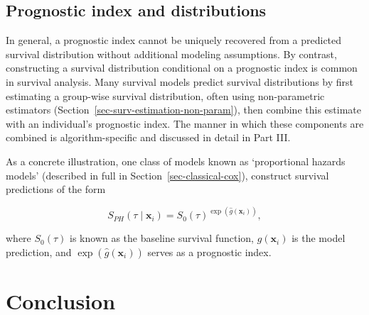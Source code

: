 \documentclass[
  letterpaper,
  krantz2]{style/krantz}
\begin{document}
\subsection{Prognostic index and
distributions}\label{prognostic-index-and-distributions}

In general, a prognostic index cannot be uniquely recovered from a
predicted survival distribution without
additional modeling assumptions. By contrast, constructing a survival
distribution conditional on a prognostic index is common in survival
analysis. Many survival models predict survival distributions by first
estimating a group-wise survival distribution, often using
non-parametric estimators
(Section~\ref{sec-surv-estimation-non-param}), then combine this
estimate with an individual's prognostic index. The manner in which
these components are combined is algorithm-specific and discussed in
detail in Part III.

As a concrete illustration, one class of models known as `proportional
hazards models' (described in full in
Section~\ref{sec-classical-cox}), construct survival predictions of the
form

\[
S_{PH}(\tau \mid \mathbf{x}_i)= S_0(\tau)^{\exp(\hat{g}(\mathbf{x}_i))},
\]

where \(S_0(\tau)\) is known as the baseline survival
function, \(\hat{g}(\mathbf{x}_i)\) is
the model prediction, and \(\exp(\hat{g}(\mathbf{x}_i))\) serves as a
prognostic index.

\section{Conclusion}\label{conclusion-3}
\end{document}
